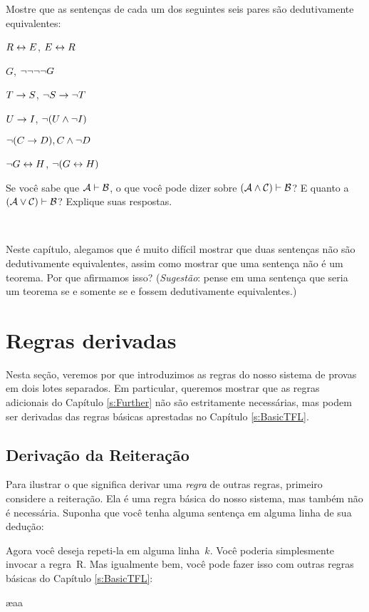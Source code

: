 \problempart
Mostre que as sentenças de cada um dos seguintes seis pares são dedutivamente equivalentes:
\begin{earg}
\item $R \leftrightarrow E$, $E \leftrightarrow R$
\item $G$, $\neg\neg\neg\neg G$
\item $T\rightarrow S$, $\neg S \rightarrow \neg T$
\item $U \rightarrow I$, $\neg(U \wedge \neg I)$
\item $\neg (C \rightarrow D), C \wedge \neg D$
\item $\neg G \leftrightarrow H$, $\neg(G \leftrightarrow H)$ 
\end{earg}

\problempart
 Se você sabe que $\mathcal{A}\vdash\mathcal{B}$, o que você pode dizer sobre $(\mathcal{A}\wedge\mathcal{C})\vdash\mathcal{B}$? E quanto a $(\mathcal{A}\vee\mathcal{C})\vdash\mathcal{B}$? Explique suas respostas.

\

\problempart Neste capítulo, alegamos que é muito difícil mostrar que duas sentenças não são dedutivamente equivalentes, assim como mostrar que uma sentença não é um teorema. Por que afirmamos isso? (\emph{Sugestão}: pense em uma sentença que seria um teorema se e somente se  e  fossem dedutivamente equivalentes.)


\chapter{Regras derivadas}\label{s:Derived}
Nesta seção, veremos por que introduzimos as regras do nosso sistema de provas em dois lotes separados. Em particular, queremos mostrar que as regras adicionais do Capítulo \ref{s:Further} não são estritamente necessárias, mas podem ser derivadas das regras básicas aprestadas no Capítulo \ref{s:BasicTFL}. 

\section{Derivação da Reiteração}
Para ilustrar o que significa derivar uma   \emph{regra} de outras regras, primeiro considere a reiteração. Ela é uma regra básica do nosso sistema, mas também não é necessária. Suponha que você tenha alguma sentença em alguma linha de sua dedução:
\begin{fitchproof}
\end{fitchproof}
Agora você deseja repeti-la em alguma linha~$k$. Você poderia simplesmente invocar a regra~R. Mas igualmente bem, você pode fazer isso com outras regras básicas do Capítulo \ref{s:BasicTFL}:
\begin{fitchproof}
	\ae{aa}
\end{fitchproof}


